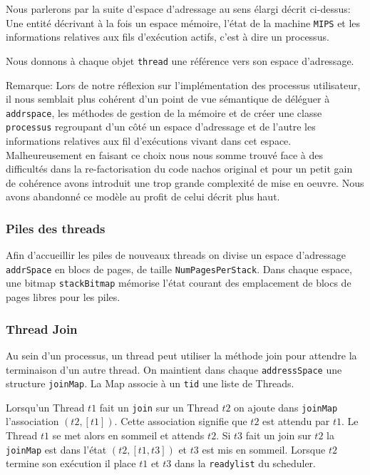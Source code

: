 \documentclass[11pt]{article}
\begin{document}
Nous parlerons par la suite d'espace d'adressage au sens élargi décrit ci-dessus:
Une entité décrivant à la fois un espace mémoire, l'état de la machine \texttt{MIPS} et les informations relatives aux fils d'exécution actifs, c'est à dire un processus.

Nous donnons à chaque objet \texttt{thread} une référence vers son espace d'adressage.

Remarque: Lors de notre réflexion sur l'implémentation des processus utilisateur, il nous semblait plus cohérent d'un point de vue sémantique de déléguer à \texttt{addrspace}, les méthodes de gestion de la mémoire
et de créer une classe \texttt{processus} regroupant d'un côté un espace d'adressage et de l'autre les informations relatives aux fil d'exécutions vivant dans cet espace. Malheureusement en faisant ce choix nous nous somme trouvé face à des difficultés dans la re-factorisation du code nachos original et pour un petit gain de cohérence avons introduit une trop grande complexité de mise en oeuvre. Nous avons abandonné ce modèle au profit de celui décrit plus haut.

\subsubsection{Piles des threads}
Afin d'accueillir les piles de nouveaux threads on divise un espace d'adressage \texttt{addrSpace} en blocs de pages, de taille \texttt{NumPagesPerStack}.
Dans chaque espace, une bitmap \texttt{stackBitmap} mémorise l'état courant des emplacement de blocs de pages libres pour les piles. 

\subsubsection{Thread Join}
Au sein d'un processus, un thread peut utiliser la méthode join pour attendre la terminaison d'un autre thread.
On maintient dans chaque \texttt{addressSpace} une structure \texttt{joinMap}.
La Map associe à un \texttt{tid} une liste de Threads.

Lorsqu'un Thread $t1$ fait un \texttt{join} sur un Thread $t2$ on ajoute dans \texttt{joinMap}
l'association $(t2, [t1])$. Cette association signifie que $t2$ est attendu par $t1$.
Le Thread $t1$ se met alors en sommeil et attends $t2$. 
Si $t3$ fait un join sur $t2$ la \texttt{joinMap} est dans l'état $(t2, [t1,t3])$ et $t3$ est mis en sommeil.
Lorsque $t2$ termine son exécution il place $t1$ et $t3$ dans la \texttt{readylist} du scheduler.
\end{document}
